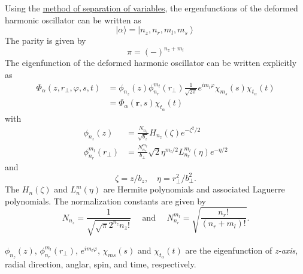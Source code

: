   Using the \underline{method of separation of variables}, the ergenfunctions of the deformed harmonic oscillator can be written as
  \begin{equation}
    |\alpha\rangle=\left|n_{z}, n_{r}, m_{l}, m_{s}\right\rangle  \label{oc_eigenfun}
  \end{equation}
  The parity is given by 
  \begin{equation}
    \pi = (-)^{n_z + m_l}
  \end{equation}
  The eigenfunction of the deformed harmonic oscillator can be written explicitly as
  \begin{equation}
    \begin{aligned}
      \Phi_{\alpha} \left( z, r_{\perp}, \varphi, s, t \right) &= \phi_{n_{z}}(z) \phi_{n_{r}}^{m_{l}} \left( r_{\perp} \right) \frac{1}{\sqrt{2 \pi}} e^{i m_{l} \varphi} \chi_{m_s}(s) \chi_{t_{\alpha}}(t) \\
      &=\Phi_{\alpha}(\boldsymbol{r}, s) \chi_{t_{\alpha}}(t) \label{oc_ergenfun_exp}
    \end{aligned}
  \end{equation}
  with
  \begin{align}
    \phi_{n_{z}}(z) &= \frac{N_{n_{z}}}{\sqrt{b_{z}}} H_{n_{z}}(\zeta) e^{-\zeta^{2} / 2} \\
    \phi_{n_r}^{m_l}(r_{\perp}) &= \frac{ N_{n_r}^{m_l} }{ b_{\perp} } \sqrt{2} \eta^{m_l/2} L_{n_r}^{m_l}(\eta) e^{-\eta/2}
  \end{align}
  and
  \begin{equation}
    \zeta = z/b_z, \quad \eta = r_\perp^2 / b_{\perp}^2.
  \end{equation}
  The $H_n(\zeta)$ and $L_n^m(\eta)$ are Hermite polynomials and associated Laguerre polynomials. The normalization constants are given by 
  \begin{equation}
    N_{n_{z}}=\frac{1}{\sqrt{\sqrt{\pi} 2^{n_{z}} n_{z} !}} \quad \text { and } \quad N_{n_{r}}^{m_{l}}=\sqrt{\frac{n_{r} !}{\left(n_{r}+m_{l}\right) !}} .
  \end{equation}
  \begin{note}
      $\phi_{n_{z}}(z)$, $\phi_{n_{r}}^{m_{l}} ( r_{\perp})$, $e^{i m_{l} \varphi}$, $\chi_{m s}(s)$ and $\chi_{t_{\alpha}}(t)$ are the eigenfunction of \textit{z-axis}, radial direction, anglar, spin, and time, respectively.
  \end{note}

